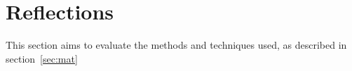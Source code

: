 \documentclass[10pt,a4paper]{article}
\begin{document}


\section{Reflections}
\label{sec:ref}

This section aims to evaluate the methods and techniques used, as described in section~\ref{sec:mat}
\end{document}
